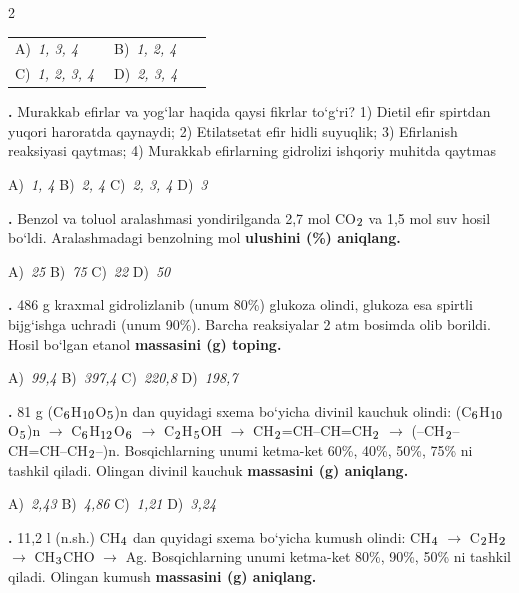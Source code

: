 \documentclass[11pt,a4paper]{article}
\renewcommand{\textsubscript}[1]{\ensuremath{_{\text{\fontsize{8}{8}\selectfont #1}}}}
\newcommand{\qn}[1]{\textbf{\fontsize{11.5}{13}\selectfont #1}}
\newcommand{\qsep}{\par\vspace{13pt}}
\begin{document}
\begin{multicols}{2}
\noindent\begin{tabular}{@{}p{0.47\linewidth}@{}p{0.47\linewidth}@{}}
A)~\textsl{1, 3, 4} & B)~\textsl{1, 2, 4} \\
C)~\textsl{1, 2, 3, 4} & D)~\textsl{2, 3, 4} \\
\end{tabular}\par
\qsep
\noindent\qn{22.} Murakkab efirlar va yog`lar haqida qaysi fikrlar to`g`ri? 1) Dietil efir spirtdan yuqori haroratda qaynaydi; 2) Etilatsetat efir hidli suyuqlik; 3) Efirlanish reaksiyasi qaytmas; 4) Murakkab efirlarning gidrolizi ishqoriy muhitda qaytmas

\noindent A)~\textsl{1, 4} \hfill B)~\textsl{2, 4} \hfill C)~\textsl{2, 3, 4} \hfill D)~\textsl{3}\par
\qsep
\noindent\qn{23.} Benzol va toluol aralashmasi yondirilganda 2,7 mol CO\textsubscript{2} va 1,5 mol suv hosil bo`ldi. Aralashmadagi benzolning mol \textbf{ulushini (\%) aniqlang.}

\noindent A)~\textsl{25} \hfill B)~\textsl{75} \hfill C)~\textsl{22} \hfill D)~\textsl{50}\par
\qsep
\noindent\qn{24.} 486 g kraxmal gidrolizlanib (unum 80\%) glukoza olindi, glukoza esa spirtli bijg`ishga uchradi (unum 90\%). Barcha reaksiyalar 2 atm bosimda olib borildi. Hosil bo`lgan etanol \textbf{massasini (g) toping.}

\noindent A)~\textsl{99,4} \hfill B)~\textsl{397,4} \hfill C)~\textsl{220,8} \hfill D)~\textsl{198,7}\par
\qsep
\noindent\qn{25.} 81 g (C\textsubscript{6}H\textsubscript{10}O\textsubscript{5})n dan quyidagi sxema bo`yicha divinil kauchuk olindi: (C\textsubscript{6}H\textsubscript{10}O\textsubscript{5})n $\to$ C\textsubscript{6}H\textsubscript{12}O\textsubscript{6} $\to$ C\textsubscript{2}H\textsubscript{5}OH $\to$ CH\textsubscript{2}=CH--CH=CH\textsubscript{2} $\to$ (--CH\textsubscript{2}--CH=CH--CH\textsubscript{2}--)n. Bosqichlarning unumi ketma-ket 60\%, 40\%, 50\%, 75\% ni tashkil qiladi. Olingan divinil kauchuk \textbf{massasini (g) aniqlang.}

\noindent A)~\textsl{2,43} \hfill B)~\textsl{4,86} \hfill C)~\textsl{1,21} \hfill D)~\textsl{3,24}\par
\qsep
\noindent\qn{26.} 11,2 l (n.sh.) CH\textsubscript{4} dan quyidagi sxema bo`yicha kumush olindi: CH\textsubscript{4} $\to$ C\textsubscript{2}H\textsubscript{2} $\to$ CH\textsubscript{3}CHO $\to$ Ag. Bosqichlarning unumi ketma-ket 80\%, 90\%, 50\% ni tashkil qiladi. Olingan kumush \textbf{massasini (g) aniqlang.}


\end{multicols}
\end{document}
